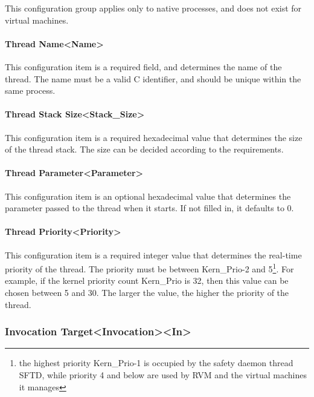 This configuration group applies only to native processes, and does not exist for virtual machines.

\paragraph{Thread Name<Name>{}}\label{par:5-3-14-16-1}

This configuration item is a required field, and determines the name of the thread. The name must be a valid C identifier, and should be unique within the same process.

\paragraph{Thread Stack Size<Stack\_Size>{}}\label{par:5-3-14-16-2}

This configuration item is a required hexadecimal value that determines the size of the thread stack. The size can be decided according to the requirements.

\paragraph{Thread Parameter<Parameter>{}}\label{par:5-3-14-16-3}

This configuration item is an optional hexadecimal value that determines the parameter passed to the thread when it starts. If not filled in, it defaults to 0.

\paragraph{Thread Priority<Priority>{}}\label{par:5-3-14-16-4}

This configuration item is a required integer value that determines the real-time priority of the thread. The priority must be between Kern\_Prio-2 and 5\footnote{the highest priority Kern\_Prio-1 is occupied by the safety daemon thread SFTD, while priority 4 and below are used by RVM and the virtual machines it manages}. For example, if the kernel priority count Kern\_Prio is 32, then this value can be chosen between 5 and 30. The larger the value, the higher the priority of the thread.

\subsubsection{Invocation Target<Invocation><In>{}}\label{subsubsec:5-3-14-17}

